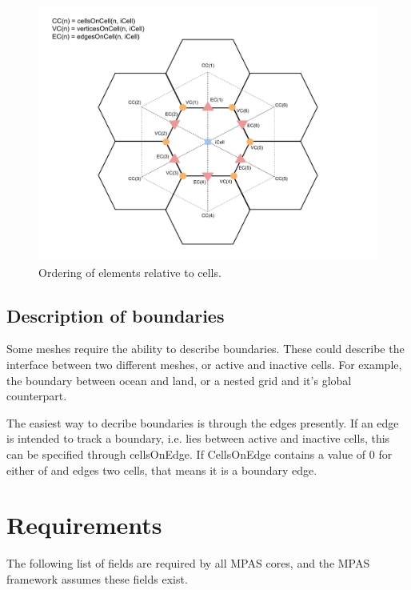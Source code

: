 \documentclass[11pt]{report}
\begin{document}
\begin{figure}[htp!]
	\centering
	\includegraphics[scale=0.4]{figures/CellDiagram.pdf}
	\caption{Ordering of elements relative to cells.}
\end{figure}



\section{Description of boundaries}

Some meshes require the ability to describe boundaries. These could describe
the interface between two different meshes, or active and inactive cells. For
example, the boundary between ocean and land, or a nested grid and it's global
counterpart.

The easiest way to decribe boundaries is through the edges presently. If an
edge is intended to track a boundary, i.e. lies between active and inactive
cells, this can be specified through cellsOnEdge. If CellsOnEdge contains a
value of 0 for either of and edges two cells, that means it is a boundary edge.

\chapter{Requirements}

The following list of fields are required by all MPAS cores, and the MPAS framework assumes these fields exist.
\end{document}
